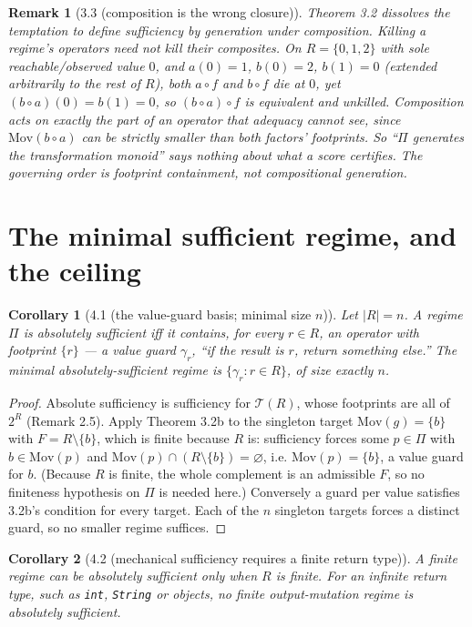 \documentclass[conference]{IEEEtran}
\newcommand{\Mov}{\mathrm{Mov}}
\theoremstyle{run}
\newtheorem*{corollary}{Corollary}
\newtheorem*{remark}{Remark}
\begin{document}
\begin{remark}[3.3 (composition is the wrong closure)]
Theorem 3.2 dissolves the temptation to define sufficiency by \emph{generation under composition}. Killing a regime's operators need not kill their composites. On $R = \{0,1,2\}$ with sole reachable/observed value $0$, and $a(0)=1$, $b(0)=2$, $b(1)=0$ (extended arbitrarily to the rest of $R$), both $a\circ f$ and $b\circ f$ die at $0$, yet $(b\circ a)(0) = b(1) = 0$, so $(b\circ a)\circ f$ is equivalent and unkilled. Composition acts on exactly the part of an operator that adequacy cannot see, since $\Mov(b\circ a)$ can be strictly smaller than both factors' footprints. So ``$\Pi$ generates the transformation monoid'' says nothing about what a score certifies. The governing order is footprint containment, not compositional generation.
\end{remark}

\setcounter{section}{3}
\section{The minimal sufficient regime, and the ceiling}
\begin{corollary}[4.1 (the value-guard basis; minimal size $n$)]
Let $|R| = n$. A regime $\Pi$ is absolutely sufficient iff it contains, for every $r \in R$, an operator with footprint $\{r\}$ --- a \emph{value guard} $\gamma_r$, ``if the result is $r$, return something else.'' The minimal absolutely-sufficient regime is $\{\gamma_r : r \in R\}$, of size exactly $n$.
\end{corollary}

\begin{proof}
Absolute sufficiency is sufficiency for $\mathcal{T}(R)$, whose footprints are all of $2^R$ (Remark 2.5). Apply Theorem 3.2b to the singleton target $\Mov(g) = \{b\}$ with $F = R \setminus \{b\}$, which is finite because $R$ is: sufficiency forces some $p\in\Pi$ with $b\in\Mov(p)$ and $\Mov(p) \cap (R\setminus\{b\}) = \varnothing$, i.e. $\Mov(p)=\{b\}$, a value guard for $b$. (Because $R$ is finite, the whole complement is an admissible $F$, so no finiteness hypothesis on $\Pi$ is needed here.) Conversely a guard per value satisfies 3.2b's condition for every target. Each of the $n$ singleton targets forces a distinct guard, so no smaller regime suffices.
\end{proof}

\begin{corollary}[4.2 (mechanical sufficiency requires a finite return type)]
A finite regime can be absolutely sufficient only when $R$ is finite. For an infinite return type, such as \texttt{int}, \texttt{String} or objects, \emph{no finite output-mutation regime is absolutely sufficient}.
\end{corollary}
\end{document}
